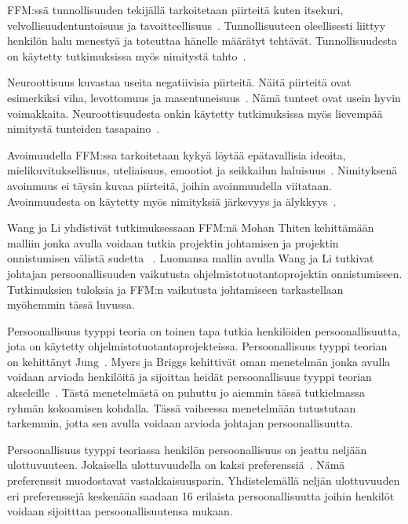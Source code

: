 \documentclass[finnish]{tktltiki2}
\theoremstyle{definition}
\theoremstyle{remark}
\begin{document}
FFM:ssä tunnollisuuden tekijällä tarkoitetaan piirteitä kuten itsekuri, velvollisuudentuntoisuus ja tavoitteellisuus~\cite{Wang:2009:PMP:1639950.1640049}. Tunnollisuuteen oleellisesti liittyy henkilön halu menestyä ja toteuttaa hänelle määrätyt tehtävät. Tunnollisuudesta on käytetty tutkimuksissa myös nimitystä tahto~\cite{digman1990personality}. 

Neuroottisuus kuvastaa useita negatiivisia piirteitä. Näitä piirteitä ovat esimerkiksi viha, levottomuus ja masentuneisuus~\cite{Wang:2009:PMP:1639950.1640049}. Nämä tunteet ovat usein hyvin voimakkaita. Neuroottisuudesta onkin käytetty tutkimuksissa myös lievempää nimitystä tunteiden tasapaino~\cite{digman1990personality}. 

Avoimuudella FFM:ssa tarkoitetaan kykyä löytää epätavallisia ideoita, mielikuvituksellisuus, uteliaisuus, emootiot ja seikkailun haluisuus~\cite{Wang:2009:PMP:1639950.1640049}. Nimityksenä avoinmuus ei täysin kuvaa piirteitä, joihin avoinmuudella viitataan. Avoinmuudesta on käytetty myös nimityksiä järkevyys ja älykkyys~\cite{digman1990personality}. 

Wang ja Li yhdistivät tutkimuksessaan FFM:nä Mohan Thiten kehittämään malliin jonka avulla voidaan tutkia projektin johtamisen ja projektin onnistumisen välistä sudetta ~\cite{Wang:2009:PMP:1639950.1640049}. Luomansa mallin avulla Wang ja Li tutkivat johtajan persoonallisuuden vaikutusta ohjelmistotuotantoprojektin onnistumiseen. Tutkimuksien tuloksia ja FFM:n vaikutusta johtamiseen tarkastellaan myöhemmin tässä luvussa.

Persoonallisuus tyyppi teoria on toinen tapa tutkia henkilöiden persoonallisuutta, jota on käytetty ohjelmistotuotantoprojekteissa. Persoonallisuus tyyppi teorian on kehittänyt Jung~\cite{jung1989psychological}. Myers ja Briggs kehittivät oman menetelmän jonka avulla voidaan arvioda henkilöitä ja sijoittaa heidät persoonallisuus tyyppi teorian akseleille~\cite{myers1985manual}. Tästä menetelmästä on puhuttu jo aiemmin tässä tutkielmassa ryhmän kokoamisen kohdalla. Tässä vaiheessa menetelmään tutustutaan tarkemmin, jotta sen avulla voidaan arvioda johtajan persoonallisuutta. 

Persoonallisuus tyyppi teoriassa henkilön persoonallisuus on jeattu neljään ulottuvuuteen. Jokaisella ulottuvuudella on kaksi preferenssiä~\cite{bradley1997effect}. Nämä preferenssit muodostavat vastakkaisuusparin. Yhdistelemällä neljän ulottuvuuden eri preferenssejä keskenään saadaan 16 erilaista persoonallisuutta joihin henkilöt voidaan sijoitttaa persoonallisuutensa mukaan.
\end{document}
